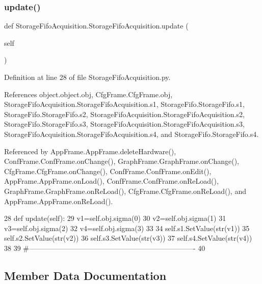 \subsubsection{\texorpdfstring{update()}{update()}}
{\footnotesize\ttfamily def Storage\+Fifo\+Acquisition.\+Storage\+Fifo\+Acquisition.\+update (\begin{DoxyParamCaption}\item[{}]{self }\end{DoxyParamCaption})}



Definition at line 28 of file Storage\+Fifo\+Acquisition.\+py.



References object.\+object.\+obj, Cfg\+Frame.\+Cfg\+Frame.\+obj, Storage\+Fifo\+Acquisition.\+Storage\+Fifo\+Acquisition.\+s1, Storage\+Fifo.\+Storage\+Fifo.\+s1, Storage\+Fifo.\+Storage\+Fifo.\+s2, Storage\+Fifo\+Acquisition.\+Storage\+Fifo\+Acquisition.\+s2, Storage\+Fifo.\+Storage\+Fifo.\+s3, Storage\+Fifo\+Acquisition.\+Storage\+Fifo\+Acquisition.\+s3, Storage\+Fifo\+Acquisition.\+Storage\+Fifo\+Acquisition.\+s4, and Storage\+Fifo.\+Storage\+Fifo.\+s4.



Referenced by App\+Frame.\+App\+Frame.\+delete\+Hardware(), Conf\+Frame.\+Conf\+Frame.\+on\+Change(), Graph\+Frame.\+Graph\+Frame.\+on\+Change(), Cfg\+Frame.\+Cfg\+Frame.\+on\+Change(), Conf\+Frame.\+Conf\+Frame.\+on\+Edit(), App\+Frame.\+App\+Frame.\+on\+Load(), Conf\+Frame.\+Conf\+Frame.\+on\+Re\+Load(), Graph\+Frame.\+Graph\+Frame.\+on\+Re\+Load(), Cfg\+Frame.\+Cfg\+Frame.\+on\+Re\+Load(), and App\+Frame.\+App\+Frame.\+on\+Re\+Load().


\begin{DoxyCode}
28     \textcolor{keyword}{def }update(self):
29         v1=self.obj.sigma(0)
30         v2=self.obj.sigma(1)
31         v3=self.obj.sigma(2)
32         v4=self.obj.sigma(3)
33 
34         self.s1.SetValue(str(v1))
35         self.s2.SetValue(str(v2))
36         self.s3.SetValue(str(v3))
37         self.s4.SetValue(str(v4))        
38 
39 \textcolor{comment}{#----------------------------------------------------------------------}
40 
\end{DoxyCode}


\subsection{Member Data Documentation}
\mbox{\label{classStorageFifoAcquisition_1_1StorageFifoAcquisition_a2d51e836bd19a5a06792f8f0e4bd1e62}} 
